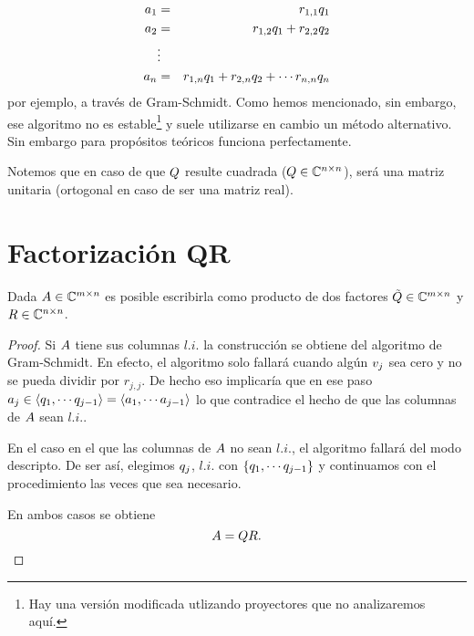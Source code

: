 \begin{tcolorbox}
\begin{eqnarray*}
\ab_1&=&r_{1,1}\qb_1\\
\ab_2&=&r_{1,2}\qb_1+r_{2,2}\qb_2\\
&\vdots&\\
\ab_n&=&r_{1,n}\qb_1+r_{2,n}\qb_2+\cdots r_{n,n}\qb_n\\
\end{eqnarray*}
por ejemplo, a través de Gram-Schmidt. Como hemos mencionado, sin embargo, ese algoritmo no es estable\footnote{Hay una versión modificada utlizando proyectores que no analizaremos aquí.} y suele utilizarse en cambio un método alternativo. Sin embargo para propósitos teóricos funciona perfectamente.

Notemos que en caso de que $\Qb$ resulte cuadrada ($\Qb\in \C^{n\times n}$), será una matriz unitaria (ortogonal en caso de ser una matriz real).

\section{Factorización QR}
\tcc
\begin{teo}
Dada $\Ab\in \C^{m\times n}$ es posible escribirla como producto de dos factores $\tilde \Qb\in \C^{m\times n}$ y $\Rb\in \C^{n\times n}$.
 \end{teo}
\etcc

\begin{proof}
 Si $\Ab$ tiene sus columnas $l.i.$
 la construcción se obtiene del algoritmo de Gram-Schmidt. En efecto, el algoritmo solo fallará cuando algún $\vb_j$ sea cero y no se pueda dividir por $r_{j,j}$. De hecho eso implicaría que en ese paso $\ab_j\in \langle\qb_1,\cdots\qb_{j-1}\rangle=\langle\ab_1,\cdots\ab_{j-1}\rangle$ lo que contradice el hecho de que las columnas de $\Ab$ sean $l.i.$.

 En el caso en el que las columnas de $\Ab$ no sean $l.i.$, el algoritmo fallará del modo descripto. De ser así, elegimos $\qb_j$, $l.i.$ con
 $\{\qb_1,\cdots\qb_{j-1}\}$ y continuamos con el procedimiento las veces que sea necesario.

 En ambos casos se obtiene
 $$
 \Ab=\Qb\Rb.
 $$


\end{proof}
\end{tcolorbox}

